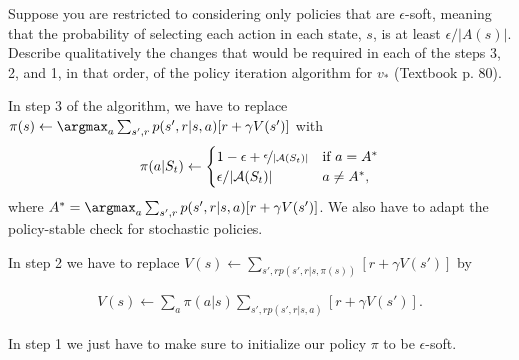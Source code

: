 
\begin{exercise}[Exercise 4.6]

Suppose you are restricted to considering only policies that are $\epsilon$-soft,
meaning that the probability of selecting each action in each state, $s$, is at
least $\epsilon/|A(s)|$. Describe qualitatively the changes that would be required
in each of the steps 3, 2, and 1, in that order, of the policy iteration algorithm for $v_*$
(Textbook p. 80).

\end{exercise}


\begin{solution}

In step 3 of the algorithm, we have to replace
$\pi(s) \leftarrow \argmax_a \sum_{s',r} p(s',r|s,a)[r + \gamma V(s')]$ with
\begin{align*}
  \pi(a|S_t) \leftarrow \begin{cases}
    1 - \epsilon + \nicefrac{\epsilon}{|\mathcal{A}(S_t)|} & \text{if } a = A^* \\
    \epsilon/|\mathcal{A}(S_t)| & a \neq A^*,
  \end{cases}
\end{align*}
where $A^* = \argmax_a \sum_{s',r} p(s',r|s,a)[r + \gamma V(s')]$.
We also have to adapt the policy-stable check for stochastic policies.


In step 2 we have to replace $V(s) \leftarrow \sum_{s',r p(s',r|s,\pi(s))}[r + \gamma V(s')]$ by

\begin{align*}
  V(s) \leftarrow \sum_a \pi(a|s) \sum_{s',r p(s',r|s,a)}[r + \gamma V(s')].
\end{align*}


In step 1 we just have to make sure to initialize our policy $\pi$ to be $\epsilon$-soft.
\end{solution}


